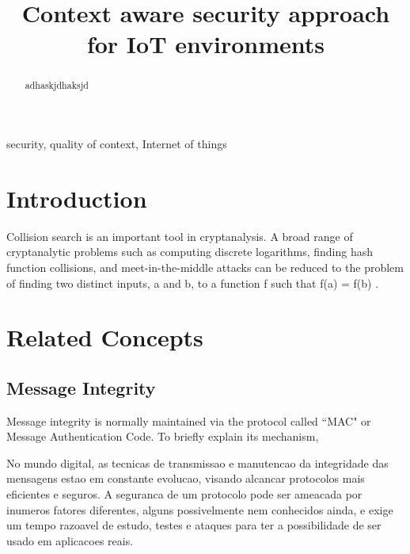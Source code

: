 \documentclass[letterpaper,conference]{IEEEtran}
\begin{document}
\title{Context aware security approach for IoT environments}
\author{
}

\maketitle

\begin{abstract}
adhaskjdhaksjd \cite{tanenbaum2002distributed}
\end{abstract}

\begin{IEEEkeywords}
security, quality of context, Internet of things
\end{IEEEkeywords}

\IEEEpeerreviewmaketitle

\section{Introduction}

Collision search is an important tool in cryptanalysis. A broad range of cryptanalytic problems
such as computing discrete logarithms, finding hash function collisions, and meet-in-the-middle
attacks can be reduced to the problem of finding two distinct inputs, a and b, to a function f such
that f(a) = f(b) \cite{van1999parallel}.

\section{Related Concepts} 

\subsection{Message Integrity}

Message integrity is normally maintained via the protocol called “MAC" or Message Authentication Code. 
To briefly explain its mechanism,

No mundo digital, as tecnicas de transmissao e manutencao da integridade das mensagens estao em constante
evolucao, visando alcancar protocolos mais eficientes e seguros. A seguranca de um protocolo pode ser ameacada
por inumeros fatores diferentes, alguns possivelmente nem conhecidos ainda, e exige um tempo razoavel de 
estudo, testes e ataques para ter a possibilidade de ser usado em aplicacoes reais.
\end{document}
